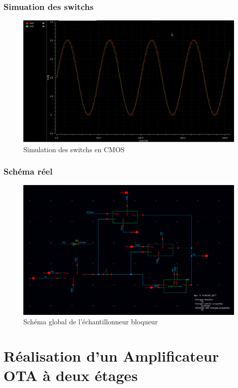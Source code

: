 \documentclass{beamer}
\begin{document}

\begin{frame}
\frametitle{Simuation des switchs}

\begin{figure}[!htb]
  \includegraphics[width=0.9\linewidth]{switchs_simu.png}
  \caption{Simulation des switchs en CMOS}
\end{figure}

\end{frame}


\begin{frame}
\frametitle{Sch\'ema r\'eel}

\begin{figure}[!htb]
  \includegraphics[width=0.8\linewidth]{EB-Schematic.png}
  \caption{Sch\'ema global de l'\'echantillonneur bloqueur}
\end{figure}

\end{frame}



\section{R\'ealisation d'un Amplificateur OTA \`a deux \'etages}
\end{document}
